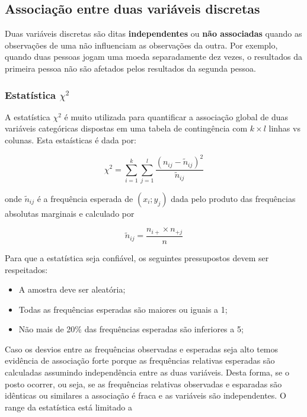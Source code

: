 \documentclass[11pt,]{style/krantz}
\providecommand{\tightlist}{%
  \setlength{\itemsep}{0pt}\setlength{\parskip}{0pt}}
\theoremstyle{definition}
\theoremstyle{definition}
\theoremstyle{definition}
\theoremstyle{remark}
\begin{document}
\hypertarget{associacao-entre-duas-variaveis-discretas}{%
\subsection{Associação entre duas variáveis discretas}\label{associacao-entre-duas-variaveis-discretas}}

Duas variáveis discretas são ditas \textbf{independentes} ou \textbf{não associadas} quando as observações de uma não influenciam as observações da outra. Por exemplo, quando duas pessoas jogam uma moeda separadamente dez vezes, o resultados da primeira pessoa não são afetados pelos resultados da segunda pessoa.

\hypertarget{estatistica-chi2}{%
\subsubsection{\texorpdfstring{Estatística \(\chi^2\)}{Estatística \textbackslash{}chi\^{}2}}\label{estatistica-chi2}}

A estatística \(\chi^2\) é muito utilizada para quantificar a associação global de duas variáveis categóricas dispostas em uma tabela de contingência com \(k \times l\) linhas vs colunas. Esta estaísticas é dada por:

\[\chi^2 = \sum_{i=1}^{k} \sum_{j=1}^{l} \frac{(n_{ij} - \widetilde{n}_{ij})^2}{\widetilde{n}_{ij}}\]

onde \(\widetilde{n}_{ij}\) é a frequência esperada de \((x_i;y_j)\) dada pelo produto das frequências absolutas marginais e calculado por

\[\widetilde{n}_{ij} = \frac{n_{i+}\times n_{+j}}{n}\]

Para que a estatística seja confiável, os seguintes pressupostos devem ser respeitados:

\begin{itemize}
\tightlist
\item
  A amostra deve ser aleatória;
\item
  Todas as frequências esperadas são maiores ou iguais a 1;
\item
  Não mais de 20\% das frequências esperadas são inferiores a 5;
\end{itemize}

Caso os desvios entre as frequências observadas e esperadas seja alto temos evidência de associação forte porque as frequências relativas esperadas são calculadas assumindo independência entre as duas variáveis. Desta forma, se o posto ocorrer, ou seja, se as frequências relativas observadas e esparadas são idênticas ou similares a associação é fraca e as variáveis são independentes. O range da estatística está limitado a
\end{document}
